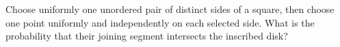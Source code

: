 Choose uniformly one unordered pair of distinct sides of a square, then choose one point uniformly and independently on each selected side. What is the probability that their joining segment intersects the inscribed disk?
